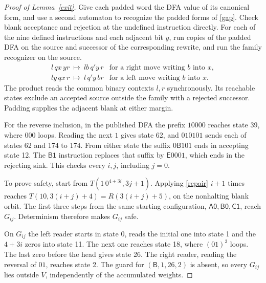 \documentclass[11pt]{article}
\newcommand{\state}[1]{\mathsf{#1}}
\begin{document}
\begin{proof}[Proof of Lemma~\ref{exit}]
Give each padded word the DFA value of its canonical form, and use a second automaton to recognize the padded forms of \eqref{gap}. Check blank acceptance and rejection at the undefined instruction directly. For each of the nine defined instructions and each adjacent bit \(y\), run copies of the padded DFA on the source and successor of the corresponding rewrite, and run the family recognizer on the source.
\[
\begin{array}{ll}
 l\,q x\,y r\ \longmapsto\ l b\,q' y\,r &\text{for a right move writing \(b\) into \(x\)},\\
 l y\,q x\,r\ \longmapsto\ l\,q' y\,b r &\text{for a left move writing \(b\) into \(x\)} .
\end{array}
\]
The product reads the common binary contexts \(l,r\) synchronously. Its reachable states exclude an accepted source outside the family with a rejected successor. Padding supplies the adjacent blank at either margin.

For the reverse inclusion, in the published DFA the prefix \(10000\) reaches state 39, where \(000\) loops. Reading the next \(1\) gives state 62, and \(010101\) sends each of states 62 and 174 to 174. From either state the suffix \(0\state B101\) ends in accepting state 12. The \(\state{B1}\) instruction replaces that suffix by \(\state E0001\), which ends in the rejecting sink. This checks every \(i,j\), including \(j=0\).

To prove safety, start from \(T(1\,0^{4+3i},3j+1)\). Applying \eqref{repair} \(i+1\) times reaches \(T(10,3(i+j)+4)=R(3(i+j)+5)\), on the nonhalting blank orbit. The first three steps from the same starting configuration, \(\state{A0,B0,C1}\), reach \(G_{ij}\). Determinism therefore makes \(G_{ij}\) safe.

On \(G_{ij}\) the left reader starts in state 0, reads the initial one into state 1 and the \(4+3i\) zeros into state 11. The next one reaches state 18, where \((01)^3\) loops. The last zero before the head gives state 26. The right reader, reading the reversal of \(01\), reaches state 2. The guard for \((\state B,1,26,2)\) is absent, so every \(G_{ij}\) lies outside \(V\), independently of the accumulated weights.
\end{proof}
\end{document}
